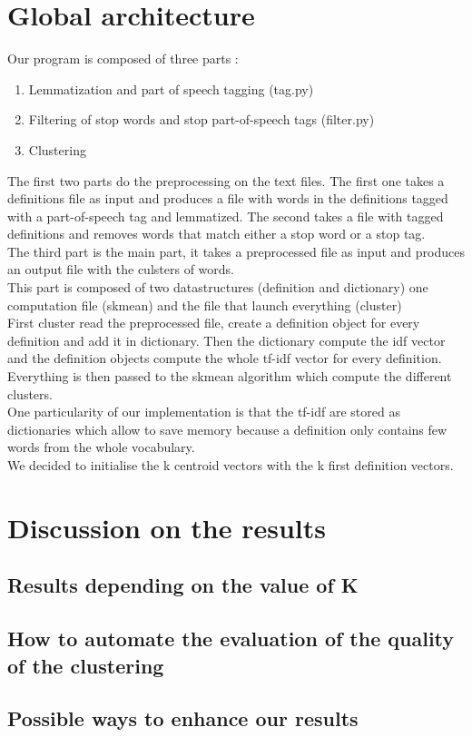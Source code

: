 \documentclass{eplDoc}
\begin{document}
\maketitle
\newpage

\section{Global architecture}

Our program is composed of three parts : 
\begin{enumerate}
	\item Lemmatization and part of speech tagging (tag.py)
	\item Filtering of stop words and stop part-of-speech tags (filter.py)
	\item Clustering  %
\end{enumerate}

The first two parts do the preprocessing on the text files. The first one takes a definitions file as input and produces a file with words in the definitions tagged with a part-of-speech tag and lemmatized. The second takes a file with tagged definitions and removes words that match either a stop word or a stop tag. \\ 

The third part is the main part, it takes a preprocessed file as input and produces an output file with the culsters of words. \\

This part is composed of two datastructures (definition and dictionary) one computation file (skmean) and the file that launch everything (cluster)\\
First cluster read the preprocessed file, create a definition object for every definition and add it in dictionary.
Then the dictionary compute the idf vector and the definition objects compute the whole tf-idf vector for every definition.
\\
Everything is then passed to the skmean algorithm which compute the different clusters.\\
One particularity of our implementation is that the tf-idf are stored as dictionaries which allow to save memory because a definition only contains few words from the whole vocabulary.
\\
We decided to initialise the k centroid vectors with the k first definition vectors.

\section{Discussion on the results}

\subsection{Results depending on the value of K}

\subsection{How to automate the evaluation of the quality of the clustering} %


\subsection{Possible ways to enhance our results} %
\end{document}
